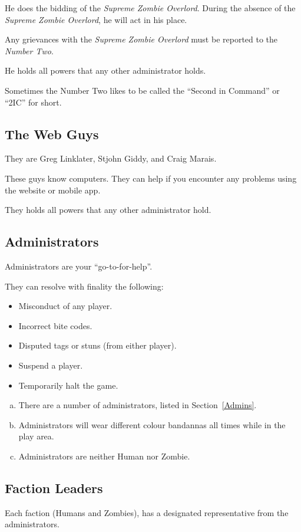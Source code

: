 \documentclass[a4paper,12pt]{article}
\newcommand{\theWebDude}{Greg Linklater}
\newcommand{\theOtherWebdude}{Stjohn Giddy}
\newcommand{\theOtherOtherWebdude}{Craig Marais}
\begin{document}
He does the bidding of the \emph{Supreme Zombie Overlord}. During the absence of the \emph{Supreme Zombie Overlord}, he will act in his place.

Any grievances with the \emph{Supreme Zombie Overlord} must be reported to the \emph{Number Two}.

He holds all powers that any other administrator holds.

Sometimes the Number Two likes to be called the ``Second in Command'' or ``2IC'' for short.

\subsection{The Web Guys}
They are \theWebDude, \theOtherWebdude, and \theOtherOtherWebdude. 

These guys know computers. They can help if you encounter any problems using the website or mobile app.

They holds all powers that any other administrator hold.

\subsection{Administrators}

Administrators are your ``go-to-for-help''.

They can resolve with finality the following:

\begin{itemize}
    \item {Misconduct of any player.}
    \item {Incorrect bite codes.}
    \item {Disputed tags or stuns (from either player).}
    \item {Suspend a player.}
    \item {Temporarily halt the game.}
\end{itemize}

\begin{enumerate}[(a)]
    \item There are a number of administrators, listed in Section~\ref{Admins}.
    \item Administrators will wear different colour bandannas all times while in the play area.
    \item Administrators are neither Human nor Zombie.
\end{enumerate}{}

\subsection{Faction Leaders}
Each faction (Humans and Zombies), has a designated representative from the administrators.\\
\end{document}
